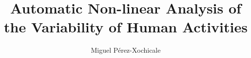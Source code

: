 \documentclass[10pt,journal,compsoc]{IEEEtran}
\begin{document}
%
\title{Automatic Non-linear Analysis of the Variability of Human Activities}
%
%
%
%

\author{Miguel P\'erez-Xochicale
}
\end{document}
